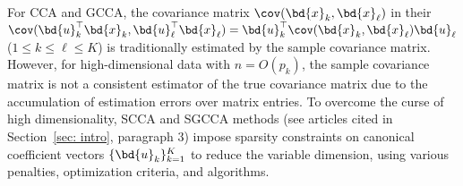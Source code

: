  
 \iffalse
 which are called . For example, 
the well-known maximum variance (MAXVAR) criterion \citep{kettenring1971canonical}
solves the optimization problem presented in Equation (\ref{eqgcca}) by defining a shared representation $\bd{g}\in \mathbb{R}^n$ of $K$ different data views $\{\mb{X}_k\in\mathbb{R}^{p_k\times n}\}_{k=1}^K$. The equation is described as:
\begin{align}
        \min_{\bd{u}_k \in \mathbb{R}^{p_k }, \bd{g} \in \mathbb{R}^{ n}} \sum_{k=1}^K\|\bd{g}^\top - \bd{u}_k^\top\mb{X}_k\|_2^2\label{eqgcca}
        \\s.t. \quad \bd{g}^\top\bd{g}/n= 1. \nonumber
\end{align}
\citet{tenenhaus2011regularized} proposed regularized generalized CCA (RGCCA), which provides a unified framework for $K$ multiview data source. The RGCCA optimization problem can be expressed as:
\begin{align}
    \underset{\bd{u}_1,\dots, \bd{u}_K}{{\max}\, } \sum_{1\le j \neq k\le K} c_{jk}g(Cov(\bd{u}_j^\top\mb{X}_j,\bd{u}_k^\top\mb{X}_k)),\label{eqrgcca}
    \\s.t.\quad \bd{u}_\ell^\top\mb{X}_\ell\mb{X}_\ell^\top\bd{u}_\ell=1,\quad \ell = 1,...,K, \nonumber
\end{align}
where $g$ is a convex differentiable function and the matrix $\mb{C} = (c_{jk})$ is a $K \times K$ symmetric matrix with positive elements specifying the desired connection design of study association between the blocks.
\fi



For CCA and GCCA,
the covariance matrix  
$\cov(\bd{x}_k,\bd{x}_\ell)$
in their
$
\cov(\bd{u}_k^\top\bd{x}_k,\bd{u}_\ell^\top\bd{x}_\ell)  
=\bd{u}_k^\top
\cov(\bd{x}_k,\bd{x}_\ell) \bd{u}_\ell
$ ($1\le k\le \ell\le K$)
is traditionally estimated by the
sample covariance matrix.
However, for high-dimensional data 
with $n=O(p_k)$,
the sample covariance matrix
is not a consistent estimator of the true covariance matrix \citep{MR950344}
due to  the accumulation of estimation errors over matrix entries.
To overcome the  curse
of high dimensionality,
SCCA 
and 
SGCCA methods (see articles cited in Section~\ref{sec: intro}, {\color{black}paragraph 3})
impose sparsity constraints on 
 canonical coefficient vectors  $\{\bd{u}_k\}_{k=1}^K$
to reduce the variable dimension, using
various penalties, optimization criteria, and algorithms.

